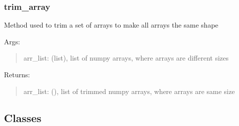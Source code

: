 \documentclass[letterpaper,10pt,english]{sphinxmanual}
\begin{document}
\subsubsection{trim\_array}
\label{\detokenize{api/mastml.plots.trim_array:trim-array}}\label{\detokenize{api/mastml.plots.trim_array::doc}}

\begin{fulllineitems}
\label{\detokenize{api/mastml.plots.trim_array:mastml.plots.trim_array}}
Method used to trim a set of arrays to make all arrays the same shape

Args:
\begin{quote}

arr\_list: (list), list of numpy arrays, where arrays are different sizes
\end{quote}

Returns:
\begin{quote}

arr\_list: (), list of trimmed numpy arrays, where arrays are same size
\end{quote}

\end{fulllineitems}



\subsection{Classes}
\label{\detokenize{12_plots:classes}}
\end{document}
